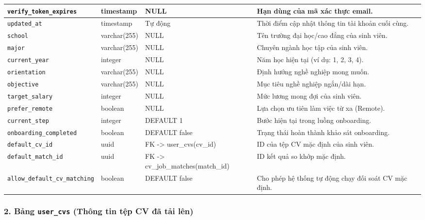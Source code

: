 \begin{footnotesize}
\begin{longtable}{|L{3.5cm}|L{2.0cm}|L{3.0cm}|L{5.5cm}|}
\hline
\texttt{verify\_\allowbreak token\_\allowbreak expires} & timestamp & NULL & Hạn dùng của mã xác thực email. \\
\hline
\texttt{updated\_at} & timestamp & Tự động & Thời điểm cập nhật thông tin tài khoản cuối cùng. \\
\hline
\texttt{school} & varchar(255) & NULL & Tên trường đại học/cao đẳng của sinh viên. \\
\hline
\texttt{major} & varchar(255) & NULL & Chuyên ngành học tập của sinh viên. \\
\hline
\texttt{current\_\allowbreak year} & integer & NULL & Năm học hiện tại (ví dụ: 1, 2, 3, 4). \\
\hline
\texttt{orientation} & varchar(255) & NULL & Định hướng nghề nghiệp mong muốn. \\
\hline
\texttt{objective} & varchar(255) & NULL & Mục tiêu nghề nghiệp ngắn/dài hạn. \\
\hline
\texttt{target\_\allowbreak salary} & integer & NULL & Mức lương mong đợi của sinh viên. \\
\hline
\texttt{prefer\_\allowbreak remote} & boolean & NULL & Lựa chọn ưu tiên làm việc từ xa (Remote). \\
\hline
\texttt{current\_\allowbreak step} & integer & DEFAULT 1 & Bước hiện tại trong luồng onboarding. \\
\hline
\texttt{onboarding\_\allowbreak completed} & boolean & DEFAULT false & Trạng thái hoàn thành khảo sát onboarding. \\
\hline
\texttt{default\_\allowbreak cv\_\allowbreak id} & uuid & FK -> user\_cvs(cv\_id) & ID của tệp CV mặc định của sinh viên. \\
\hline
\texttt{default\_\allowbreak match\_\allowbreak id} & uuid & FK -> cv\_\allowbreak job\_\allowbreak matches(match\_\allowbreak id) & ID kết quả so khớp mặc định. \\
\hline
\texttt{allow\_\allowbreak default\_\allowbreak cv\_\allowbreak matching} & boolean & DEFAULT false & Cho phép hệ thống tự động chạy đối soát CV mặc định. \\
\hline
\end{longtable}
\end{footnotesize}

\subsubsection*{2. Bảng \texttt{user\_cvs} (Thông tin tệp CV đã tải lên)}

